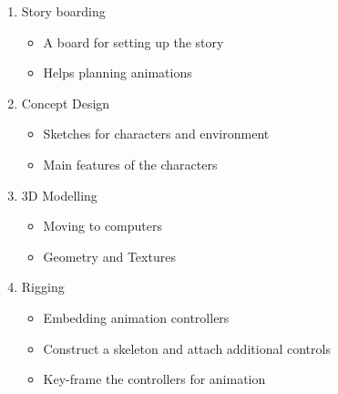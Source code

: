 \documentclass{article}
\begin{document}
\begin{minipage}[t]{0.49\textwidth}
    \addtopstrut
    \begin{enumerate}[font=\bfseries, itemsep=-4px]
        \item Story boarding \vspace{-6px} 
            \begin{itemize}
                \itemsep-3px
                \item A board for setting up the story
                \item Helps planning animations
            \end{itemize}
        \item Concept Design \vspace{-6px} 
            \begin{itemize}
                \itemsep-3px
                \item Sketches for characters and environment
                \item Main features of the characters
            \end{itemize}
        \item 3D Modelling \vspace{-6px} 
            \begin{itemize}
                \itemsep-3px
                \item Moving to computers
                \item Geometry and Textures
            \end{itemize}
        \item Rigging \vspace{-6px} 
            \begin{itemize}
                \itemsep-3px
                \item Embedding animation controllers
                \item Construct a skeleton and attach additional controls
                \item Key-frame the controllers for animation
            \end{itemize}
    \end{enumerate}
    \addbottomstrut
\end{minipage}
\end{document}
